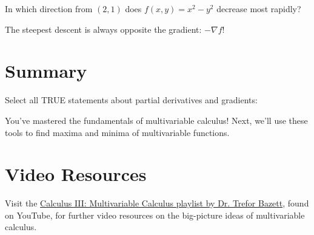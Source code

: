 \documentclass{ximera}
\begin{document}
\begin{problem}
In which direction from $(2, 1)$ does $f(x, y) = x^2 - y^2$ decrease most rapidly?

\begin{multipleChoice}
\end{multipleChoice}

\begin{feedback}
The steepest descent is always opposite the gradient: $-\nabla f$!
\end{feedback}
\end{problem}

\section*{Summary}

\begin{problem}
Select all TRUE statements about partial derivatives and gradients:

\begin{selectAll}
\end{selectAll}

\begin{feedback}
You've mastered the fundamentals of multivariable calculus! Next, we'll use these tools to find maxima and minima of multivariable functions.
\end{feedback}
\end{problem}

\section*{Video Resources}

Visit the \href{https://www.youtube.com/playlist?list=PLHXZ9OQGMqxc_CvEy7xBKRQr6I214QJcd}{Calculus III: Multivariable Calculus playlist by Dr. Trefor Bazett}, found on YouTube, for further video resources on the big-picture ideas of multivariable calculus.
\end{document}
